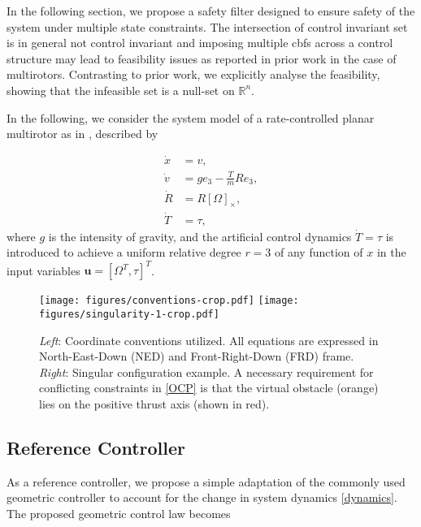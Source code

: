 In the following section, we propose a safety filter designed to ensure safety of the system under multiple state constraints. The intersection of control invariant set is in general not control invariant and imposing multiple \acp{cbf} across a control structure may lead to feasibility issues as reported in prior work \cite{cascaded_CBF} in the case of multirotors. Contrasting to prior work, we explicitly analyse the feasibility, showing that the infeasible set is a null-set on $\mathbb{R}^n$.

In the following, we consider the system model of a rate-controlled planar multirotor as in \cite{backstepping_CBF}, described by

\vspace{-3ex}
\small
\begin{subequations}\label{dynamics}
\begin{align}
    \dot x &= v, \label{position_dynamics} \\
    \dot v &= ge_3 - \frac{T}{m} R e_3, \label{linvel_dynamics} \\
    \dot R &= R[\Omega]_{\times}, \label{attitude_dynamics} \\
    \dot T &= \tau, \label{angvel_dynamics}
\end{align}
\end{subequations}
\normalsize
where $g$ is the intensity of gravity, and the artificial control dynamics $\dot T = \tau$ is introduced to achieve a uniform relative degree $r=3$ of any function of $x$ in the input variables $\mathbf{u} = [\Omega^T, \tau]^T$.
\begin{figure}
    \centering
    \texttt{[image: figures/conventions-crop.pdf]}
    \hspace{1cm}
    \texttt{[image: figures/singularity-1-crop.pdf]}
    \caption{\small \textit{Left}: Coordinate conventions utilized. All equations are expressed in North-East-Down (NED) and Front-Right-Down (FRD) frame. \textit{Right}: Singular configuration example. A necessary requirement for conflicting constraints in \eqref{OCP} is that the virtual obstacle (orange) lies on the positive thrust axis (shown in red).}
    \label{fig:conventions}
    \vspace{-6ex}
\end{figure}
%
\subsection{Reference Controller}
As a reference controller, we propose a simple adaptation of the commonly used geometric controller \cite{Lee} to account for the change in system dynamics \eqref{dynamics}. The proposed geometric control law becomes

